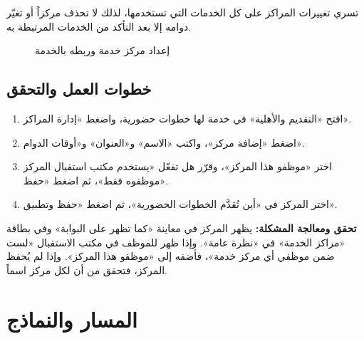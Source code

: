 \begin{rcwarn}
تسري تغييرات المراكز على كل الخدمات التي تستخدمها، لذلك لا تحذف مركزاً أو تغيّر دوامه إلا بعد التأكد من الخدمات المرتبطة به.
\end{rcwarn}

\begin{figure}[H]
\centering
{}
\rclegend
\caption{إعداد مركز خدمة وربطه بالخدمة}
\label{fig:builder-services-centers-flow}
\end{figure}

\subsection{خطوات العمل والتحقق}
\begin{enumerate}
\item افتح «التقديم والأهلية» في خدمة لها خطوات حضورية، واضغط «إدارة المراكز».
\item اضغط «إضافة مركز»، واكتب «الاسم» و«العنوان» و«أوقات الدوام».
\item اختر «موظفو هذا المركز»، وقرّر هل تفعّل «يستخدم مكتب استقبال المركز موظفوه فقط»، ثم اضغط «حفظ».
\item اختر المركز في «أين تُقدَّم الخطوات الحضورية»، ثم اضغط «حفظ وتطبيق».
\end{enumerate}

\textbf{تحقق ومعالجة المشكلة:} يظهر المركز في معاينة «كما تظهر على البوابة» وفي بطاقة «مراكز الخدمة» في «نظرة عامة». وإذا ظهر للموظف في مكتب الاستقبال «لست ضمن موظفي أي مركز خدمة»، فأضفه إلى «موظفو هذا المركز». وإذا لم يُحفظ المركز، فتحقق من أن لكل مركز اسماً.

\clearpage
\section{المسار والنماذج}
\label{sec:builder-feature-services-path}

